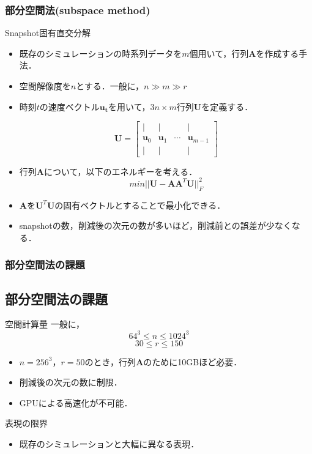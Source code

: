 \documentclass[aspectratio=169,dvipdfmx,hyperref={bookmarks=true}]{beamer}
\begin{document}
\begin{frame}
  \frametitle{部分空間法(subspace method)}
   \begin{block}{Snapshot固有直交分解}
   \begin{itemize}
   \item 既存のシミュレーションの時系列データを$m$個用いて，行列$\mathbf{A}$を作成する手法．
   
\item 空間解像度を$n$とする．一般に，$n \gg m \gg r$ 
\item 時刻$t$の速度ベクトル$\bm{u_t}$を用いて，$3n\times m$行列$\mathbf{U}$を定義する．

	 \[ \mathbf{U} = 
        		\begin{bmatrix}
   | & | &  & |\\
   \bm{u}_0 & \bm{u}_1 &\cdots  & \bm{u}_{m-1} \\
   | & | &  & |
\end{bmatrix}
\]
\item 行列$\mathbf{A}$について，以下のエネルギーを考える．
\[
min || \mathbf{U} -  \mathbf{A}\mathbf{A}^T \mathbf{U}||^2_F
\]

\item $\mathbf{A}$を$\mathbf{U}^T\mathbf{U}$の固有ベクトルとすることで最小化できる．
\item snapshotの数，削減後の次元の数が多いほど，削減前との誤差が少なくなる．
\end{itemize}
\end{block}

 \end{frame}
\begin{frame}
\frametitle{部分空間法の課題}
\subsection{部分空間法の課題}
	\begin{block}{空間計算量}
		一般に，
		\[64^3 \le n \le 1024^3\]
		\[30 \le r \le 150\]

   		\begin{itemize}
			\item $n = 256^3$，$r=50$のとき，行列$\mathbf{A}$のために10GBほど必要．
   			\item 削減後の次元の数に制限．
   			\item GPUによる高速化が不可能．
		\end{itemize}
	\end{block}

	\begin{block}{表現の限界}
 		\begin{itemize}
		\item 既存のシミュレーションと大幅に異なる表現．
	\end{itemize}
	\end{block}
\end{frame}
\end{document}
